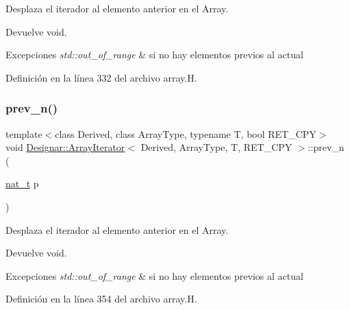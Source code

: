 Desplaza el iterador al elemento anterior en el Array. 

\begin{DoxyReturn}{Devuelve}
void. 
\end{DoxyReturn}

\begin{DoxyExceptions}{Excepciones}
{\em std\+::out\+\_\+of\+\_\+range} & si no hay elementos previos al actual \\
\hline
\end{DoxyExceptions}


Definición en la línea 332 del archivo array.\+H.

\mbox{\label{class_designar_1_1_array_iterator_a5a417cab0b0b039c69d5a52a513a019f}} 
\subsubsection{\texorpdfstring{prev\+\_\+n()}{prev\_n()}}
{\footnotesize\ttfamily template$<$class Derived, class Array\+Type, typename T, bool R\+E\+T\+\_\+\+C\+PY$>$ \\
void \hyperlink{class_designar_1_1_array_iterator}{Designar\+::\+Array\+Iterator}$<$ Derived, Array\+Type, T, R\+E\+T\+\_\+\+C\+PY $>$\+::prev\+\_\+n (\begin{DoxyParamCaption}\item[{\hyperlink{namespace_designar_aa72662848b9f4815e7bf31a7cf3e33d1}{nat\+\_\+t}}]{p }\end{DoxyParamCaption})\hspace{0.3cm}{\ttfamily [inline]}}



Desplaza el iterador al elemento anterior en el Array. 

\begin{DoxyReturn}{Devuelve}
void. 
\end{DoxyReturn}

\begin{DoxyExceptions}{Excepciones}
{\em std\+::out\+\_\+of\+\_\+range} & si no hay elementos previos al actual \\
\hline
\end{DoxyExceptions}


Definición en la línea 354 del archivo array.\+H.


